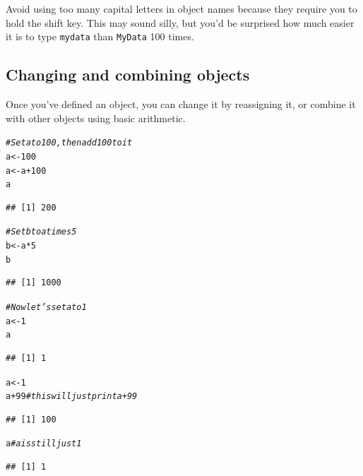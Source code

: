 \documentclass{tufte-book}\usepackage[]{graphicx}\usepackage[]{color}
\makeatletter
\newcommand{\hlnum}[1]{\textcolor[rgb]{0.686,0.059,0.569}{#1}}%
\newcommand{\hlcom}[1]{\textcolor[rgb]{0.678,0.584,0.686}{\textit{#1}}}%
\newcommand{\hlopt}[1]{\textcolor[rgb]{0,0,0}{#1}}%
\newcommand{\hlstd}[1]{\textcolor[rgb]{0.345,0.345,0.345}{#1}}%
\newcommand{\hlkwb}[1]{\textcolor[rgb]{0.69,0.353,0.396}{#1}}%
\newenvironment{kframe}{%
 \def\at@end@of@kframe{}%
 \ifinner\ifhmode%
  \def\at@end@of@kframe{\end{minipage}}%
  \begin{minipage}{\columnwidth}%
 \fi\fi%
 \def\FrameCommand##1{\hskip\@totalleftmargin \hskip-\fboxsep
 \colorbox{shadecolor}{##1}\hskip-\fboxsep
     \hskip-\linewidth \hskip-\@totalleftmargin \hskip\columnwidth}%
 \MakeFramed {\advance\hsize-\width
   \@totalleftmargin\z@ \linewidth\hsize
   \@setminipage}}%
 {\par\unskip\endMakeFramed%
 \at@end@of@kframe}
\newenvironment{knitrout}{}{} %
\makeatother
\begin{document}
Avoid using too many capital letters in object names because they require you to hold the shift key. This may sound silly, but you'd be surprised how much easier it is to type \texttt{mydata} than \texttt{MyData} 100 times.

\subsection{Changing and combining objects}

Once you've defined an object, you can change it by reassigning it, or combine it with other objects using basic arithmetic.

\begin{knitrout}
\color{fgcolor}\begin{kframe}
\begin{alltt}
\hlcom{# Set a to 100, then add 100 to it}
\hlstd{a} \hlkwb{<-} \hlnum{100}
\hlstd{a} \hlkwb{<-} \hlstd{a} \hlopt{+} \hlnum{100}
\hlstd{a}
\end{alltt}
\begin{verbatim}
## [1] 200
\end{verbatim}
\begin{alltt}
\hlcom{# Set b to a times 5}
\hlstd{b} \hlkwb{<-} \hlstd{a} \hlopt{*} \hlnum{5}
\hlstd{b}
\end{alltt}
\begin{verbatim}
## [1] 1000
\end{verbatim}
\begin{alltt}
\hlcom{# Now let's set a to 1}
\hlstd{a} \hlkwb{<-} \hlnum{1}
\hlstd{a}
\end{alltt}
\begin{verbatim}
## [1] 1
\end{verbatim}
\end{kframe}
\end{knitrout}



\begin{marginfigure}
\begin{knitrout}
\color{fgcolor}\begin{kframe}
\begin{alltt}
\hlstd{a} \hlkwb{<-} \hlnum{1}
\hlstd{a} \hlopt{+} \hlnum{99} \hlcom{# this will just print a + 99}
\end{alltt}
\begin{verbatim}
## [1] 100
\end{verbatim}
\begin{alltt}
\hlstd{a} \hlcom{# a is still just 1}
\end{alltt}
\begin{verbatim}
## [1] 1
\end{verbatim}
\end{kframe}
\end{knitrout}
\end{marginfigure}
\end{document}
